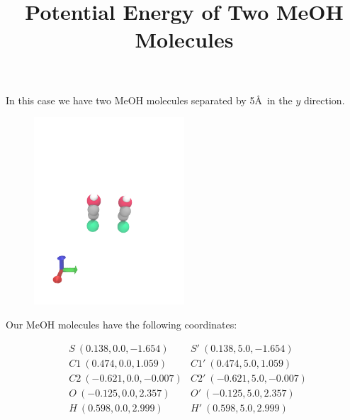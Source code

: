 \documentclass{article}\usepackage[]{graphicx}\usepackage[]{color}
\begin{document}
\title{Potential Energy of Two MeOH Molecules}
\maketitle

In this case we have two MeOH molecules separated by 5\AA\ in the $y$ direction.

\begin{figure}[H]
  \center
  \includegraphics[trim=0 0 0 300,clip,width=0.5\textwidth]{two_meoh}
\end{figure}

Our MeOH molecules have the following coordinates:

\begin{align*}
  &S\ (0.138,0.0,-1.654)   &S'\ (0.138,5.0,-1.654)\\
  &C1\ (0.474,0.0,1.059)   &C1'\ (0.474,5.0,1.059)\\
  &C2\ (-0.621,0.0,-0.007) &C2'\ (-0.621,5.0,-0.007)\\
  &O\ (-0.125,0.0,2.357)   &O'\ (-0.125,5.0,2.357)\\
  &H\ (0.598,0.0,2.999)    &H'\ (0.598,5.0,2.999)\\
\end{align*}
\end{document}

